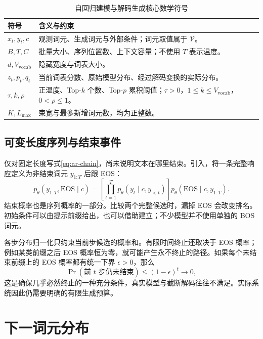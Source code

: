 \documentclass[../textbook.tex]{subfiles}
\begin{document}
\begin{table}[htbp]
\centering
\caption{自回归建模与解码生成核心数学符号}\label{tab:generation-notations}
\begin{tabularx}{\linewidth}{p{24mm}X}
\toprule
符号 & 含义与约束\\\midrule
$x_t,y_t,c$ & 观测词元、生成词元与外部条件；词元取值属于 $\mathcal V$。\\
$B,T,C$ & 批量大小、序列位置数、上下文容量；不使用 $T$ 表示温度。\\
$d,V_{\mathrm{vocab}}$ & 隐藏宽度与词表大小。\\
$z_t,p_t,q_t$ & 当前词表分数、原始模型分布、经过解码变换的实际分布。\\
$\tau,k,\rho$ & 正温度、Top-$k$ 个数、Top-$p$ 累积阈值；$\tau>0$，$1\leq k\leq V_{\mathrm{vocab}}$，$0<\rho\leq1$。\\
$K,L_{\max}$ & 束宽与最多新增词元数，均为正整数。\\
\bottomrule
\end{tabularx}
\end{table}

\subsection{可变长度序列与结束事件}
仅对固定长度写式\eqref{eq:ar-chain}，尚未说明文本在哪里结束。引入，将一条完整响应定义为非结束词元 $y_{1:T}$ 后跟 EOS：
\begin{equation}
 p_\theta(y_{1:T},\mathrm{EOS}\mid c)
 =\left[\prod_{t=1}^{T}p_\theta(y_t\mid c,y_{<t})\right]
 p_\theta(\mathrm{EOS}\mid c,y_{1:T}).\label{eq:ar-eos-prob}
\end{equation}
结束概率也是序列概率的一部分。比较两个完整候选时，漏掉 EOS 会改变排名。初始条件可以由提示前缀给出，也可以借助建立；不少模型并不使用单独的 BOS 词元。

各步分布归一化只约束当前步候选的概率和。有限时间终止还取决于 EOS 概率；例如某类前缀之后 EOS 概率恒为零，就可能产生永不终止的路径。如果每个未结束前缀上的 EOS 概率都有统一下界 $\epsilon>0$，那么
\begin{equation}
 \Pr(\text{前 }t\text{ 步仍未结束})\leq(1-\epsilon)^t\longrightarrow0,
\end{equation}
这是确保几乎必然终止的一种充分条件，真实模型与截断解码往往不满足。实际系统因此仍需要明确的有限生成预算。

\section{下一词元分布}
\end{document}
